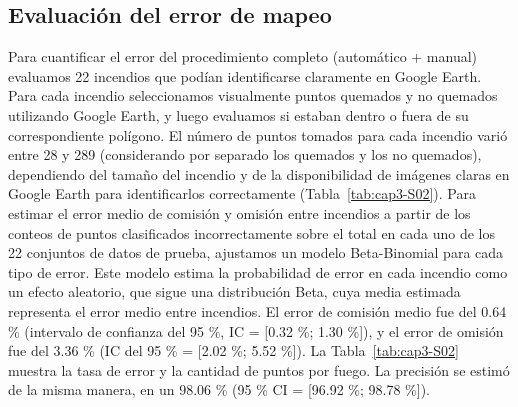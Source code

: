 \subsection{Evaluación del error de mapeo}\label{append:mapeo-error}

Para cuantificar el error del procedimiento completo (automático + manual) evaluamos 22 incendios que podían identificarse claramente en Google Earth. Para cada incendio seleccionamos visualmente puntos quemados y no quemados utilizando Google Earth, y luego evaluamos si estaban dentro o fuera de su correspondiente polígono. El número de puntos tomados para cada incendio varió entre 28 y 289 (considerando por separado los quemados y los no quemados), dependiendo del tamaño del incendio y de la disponibilidad de imágenes claras en Google Earth para identificarlos correctamente (Tabla~\ref{tab:cap3-S02}). Para estimar el error medio de comisión y omisión entre incendios a partir de los conteos de puntos clasificados incorrectamente sobre el total en cada uno de los 22 conjuntos de datos de prueba, ajustamos un modelo Beta-Binomial para cada tipo de error. Este modelo estima la probabilidad de error en cada incendio como un efecto aleatorio, que sigue una distribución Beta, cuya media estimada representa el error medio entre incendios. El error de comisión medio fue del 0.64 \% (intervalo de confianza del 95 \%, IC = [0.32 \%; 1.30 \%]), y el error de omisión fue del 3.36 \% (IC del 95 \% = [2.02 \%; 5.52 \%]). La Tabla~\ref{tab:cap3-S02} muestra la tasa de error y la cantidad de puntos por fuego. La precisión se estimó de la misma manera, en un 98.06 \% (95 \% CI = [96.92 \%; 98.78 \%]).

